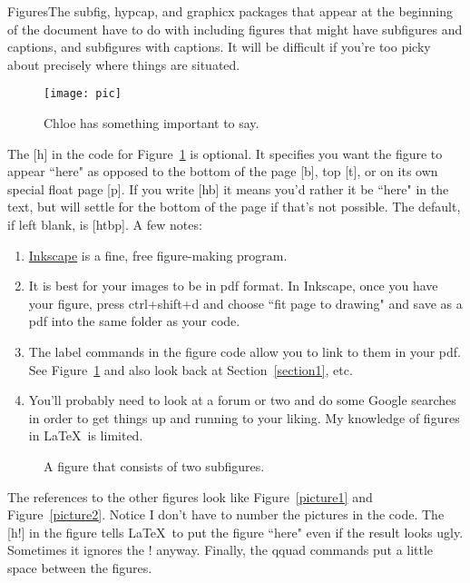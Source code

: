 \documentclass{amsart}					%
\theoremstyle{definition}
\begin{document}
\newpage %

\begin{section}{Figures}The subfig, hypcap, and graphicx packages that appear at the beginning of the document have to do with including figures that might have subfigures and captions, and subfigures with captions. It will be difficult if you're too picky about precisely where things are situated.

\begin{figure}[h]\capstart
	\begin{center}\texttt{[image: pic]}\end{center}
	\caption{Chloe has something important to say.}\label{picture}
\end{figure}

The [h] in the code for Figure~\ref{picture} is optional. It specifies you want the figure to appear ``here" as opposed to the bottom of the page [b], top [t], or on its own special float page [p]. If you write [hb] it means you'd rather it be ``here" in the text, but will settle for the bottom of the page if that's not possible. The default, if left blank, is [htbp]. A few notes:
\begin{enumerate}
\item \href{http://inkscape.org}{Inkscape} is a fine, free figure-making program.
\item It is best for your images to be in pdf format. In Inkscape, once you have your figure, press ctrl+shift+d and choose ``fit page to drawing" and save as a pdf into the same folder as your code.
\item The label commands in the figure code allow you to link to them in your pdf. See Figure~\ref{picture} and also look back at Section~\ref{section1}, etc.
\item You'll probably need to look at a forum or two and do some Google searches in order to get things up and running to your liking. My knowledge of figures in \LaTeX \ is limited.
\end{enumerate}

\begin{figure}[h!]\capstart%
	\centering\capstart
	 \qquad \qquad
	\caption{A figure that consists of two subfigures.}
\end{figure}

The references to the other figures look like Figure~\ref{picture1} and Figure~\ref{picture2}. Notice I don't have to number the pictures in the code. The [h!] in the figure tells \LaTeX \ to put the figure ``here" even if the result looks ugly. Sometimes it ignores the ! anyway. Finally, the qquad commands put a little space between the figures.
\end{section}
\end{document}

